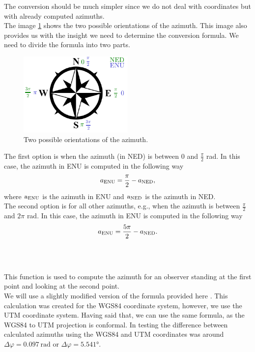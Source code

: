             The conversion should be much simpler since we do not deal with coordinates but with already computed azimuths.\\
            The image \ref{fig:dir_indi} shows the two possible orientations of the azimuth. This image also provides us with the insight we need to determine the conversion formula. We need to divide the formula into two parts.\\
            \begin{figure}[ht]
                \centering
                \includegraphics[width=0.5\textwidth]{images/direction_indicator.pdf}
                \caption{Two possible orientations of the azimuth.}
                \label{fig:dir_indi}
            \end{figure}
            \noindent The first option is when the azimuth (in NED) is between 0 and $\frac{\pi}{2}$ rad. In this case, the azimuth in ENU is computed in the following way
            \begin{equation}
                a_{\rm{ENU}} = \frac{\pi}{2} - a_{\rm{NED}},
            \end{equation}
            where $\text{a}_{\rm{ENU}}$ is the azimuth in ENU and $\text{a}_{\rm{NED}}$ is the azimuth in NED.\\
            The second option is for all other azimuths, e.g., when the azimuth is between $\frac{\pi}{2}$ and $2\pi$ rad. In this case, the azimuth in ENU is computed in the following way
            \begin{equation}
                a_{\rm{ENU}} = \frac{5\pi}{2} - a_{\rm{NED}}.
            \end{equation}\\\\
        \\
            This function is used to compute the azimuth for an observer standing at the first point and looking at the second point.\\
            We will use a slightly modified version of the formula provided here \cite{calc_bearing}. This calculation was created for the WGS84 coordinate system, however, we use the UTM coordinate system. Having said that, we can use the same formula, as the WGS84 to UTM projection is conformal\cite{Map_projections}. In testing the difference between calculated azimuths using the WGS84 and UTM coordinates was around $\Delta\varphi=0.097\:\si{\radian}$ or $\Delta\varphi=5.541\si{\degree}$.\\
